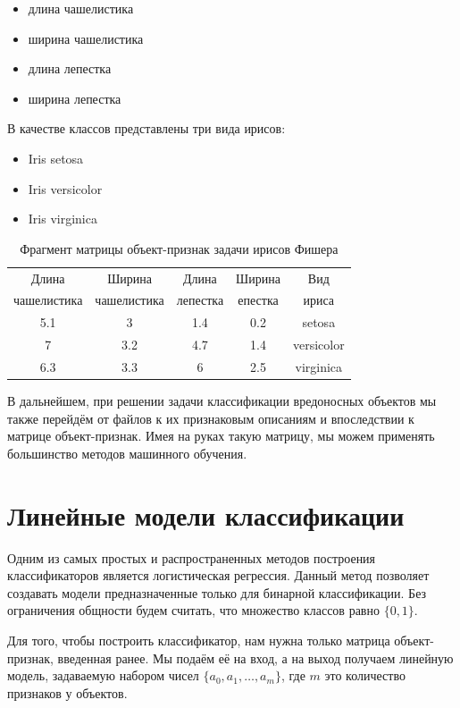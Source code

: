 \begin{itemize}
\item длина чашелистика
\item ширина чашелистика
\item длина лепестка
\item ширина лепестка
\end{itemize}

\newpage
В качестве классов представлены три вида ирисов:
\begin{itemize}
\item Iris setosa
\item Iris versicolor
\item Iris virginica 
\end{itemize}


\begin{table}[ht]
\caption{Фрагмент матрицы объект-признак задачи ирисов Фишера}
\label{tab_weight}
\centering
    \begin{tabular}{|c|c|c|c|c|}
    \hline Длина  & Ширина  & Длина  & Ширина  & Вид  \\
    чашелистика & чашелистика & лепестка & епестка & ириса \\
    \hline 5.1 & 3 & 1.4 & 0.2 & setosa  \\
    \hline 7 & 3.2 & 4.7 & 1.4 & versicolor  \\
    \hline 6.3 & 3.3 & 6 & 2.5 & virginica  \\
    \hline
    \end{tabular}
\end{table}

В дальнейшем, при решении задачи классификации вредоносных объектов мы также перейдём от файлов к их признаковым описаниям и впоследствии к матрице объект-признак.
Имея на руках такую матрицу, мы можем применять большинство методов машинного обучения.

\section{Линейные модели классификации}

Одним из самых простых и распространенных методов построения классификаторов является логистическая регрессия. Данный метод позволяет создавать модели предназначенные только для бинарной классификации. Без ограничения общности будем считать, что множество классов равно $\{0, 1\}$.

Для того, чтобы построить классификатор, нам нужна только матрица объект-признак, введенная ранее. Мы подаём её на вход, а на выход получаем линейную модель, задаваемую набором чисел $\{a_0, a_1,…, a_m\}$, где $m$ это количество признаков у объектов. 

